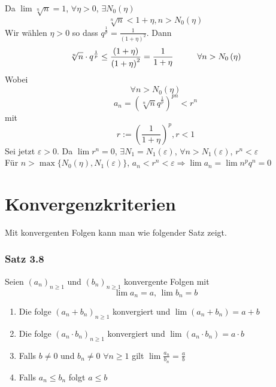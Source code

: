 Da $\lim\sqrt[n]{n}=1$, $\forall\eta >0$, $\exists N_0(\eta)$ \[\sqrt[n]{n}<1+\eta, n>N_0(\eta)\]
Wir wählen $\eta >0$ so dass ${q^{\frac{1}{p}}} = \frac{1}{{{{\left( {1 + \eta } \right)}^2}}}$. Dann
\[\sqrt[n]{n}\cdot q^{\frac{1}{p}}\leq\frac{\left( 1+\eta\right)}{\left( 1+\eta\right)^2}=\frac{1}{1+\eta}\hspace{10mm} \forall n>N_0\left(\eta\right)\]
Wobei \[\forall n>N_0\left(\eta\right)\]\[a_n=\left( \sqrt[n]{n}q^{\frac{1}{p}}\right)^{pn}<r^n\] mit \[r:=\left( \frac{1}{1+\eta}\right)^p, r<1\]
Sei jetzt $\varepsilon>0$. Da $\lim r^n=0$, $\exists N_1=N_1(\varepsilon)$, $\forall n>N_1(\varepsilon)$, $r^n<\varepsilon$\\

\noindent Für $n>\max\{N_0\left(\eta\right), N_1(\varepsilon)\}$, $a_n<r^n<\varepsilon \Rightarrow \lim a_n=\lim n^pq^n=0$ 

\section{Konvergenzkriterien}
Mit konvergenten Folgen kann man  wie folgender Satz zeigt.
\subsubsection*{Satz 3.8}
Seien $\left( a_n\right)_{n\geq 1}$ und $\left( b_n\right)_{n\geq 1}$ konvergente Folgen mit 
\[\lim a_n=a\text{, }\lim b_n=b\]
\begin{enumerate}[\hspace{2mm}i)]
\item Die folge $\left( a_n+b_n\right)_{n\geq 1}$ konvergiert und $\lim\left( a_n+b_n\right)=a+b$
\item Die folge $\left( a_n\cdot b_n\right)_{n\geq 1}$ konvergiert und $\lim\left( a_n\cdot b_n\right)=a\cdot b$
\item Falls $b\not=0$ und $b_n\not=0$ $\forall n\geq 1$ gilt $\lim\frac{a_n}{b_n}=\frac{a}{b}$ 
\item Falls $a_n\leq b_n$ folgt $a\leq b$
\end{enumerate}

